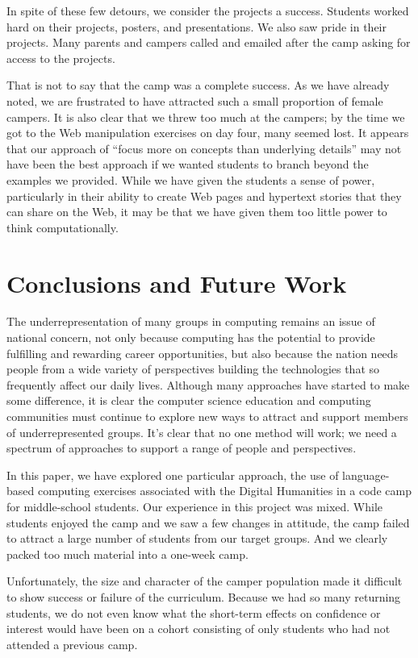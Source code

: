 In spite of these few detours, we consider the projects a success.
Students worked hard on their projects, posters, and presentations.
We also saw pride in their projects.  Many parents and campers
called and emailed after the camp asking for access to the projects.

That is not to say that the camp was a complete success.  As we
have already noted, we are frustrated to have attracted such a small
proportion of female campers.  It is also clear that we threw too
much at the campers; by the time we got to the Web manipulation
exercises on day four, many seemed lost.  It appears that our
approach of ``focus more on concepts than underlying details'' may
not have been the best approach if we wanted students to branch
beyond the examples we provided.  While we have given the students
a sense of power, particularly in their ability to create Web pages
and hypertext stories that they can share on the Web, it may be
that we have given them too little power to think computationally.

\section{Conclusions and Future Work}

The underrepresentation of many groups in computing remains an issue
of national concern, not only because computing has the potential
to provide fulfilling and rewarding career opportunities, but also
because the nation needs people from a wide variety of perspectives
building the technologies that so frequently affect our daily lives.
Although many approaches have started to make some difference, it
is clear the computer science education and computing communities
must continue to explore new ways to attract and support members
of underrepresented groups.  It's clear that no one method will
work; we need a spectrum of approaches to support a range of
people and perspectives.

In this paper, we have explored one particular approach, the use
of language-based computing exercises associated with the Digital
Humanities in a code camp for middle-school students.  Our experience
in this project was mixed.  While students enjoyed the camp
and we saw a few changes in attitude, the camp failed to attract a
large number of students from our target groups.  And we clearly
packed too much material into a one-week camp.

Unfortunately, the size and character of the camper population made
it difficult to show success or failure of the curriculum.  Because
we had so many returning students, we do not even know what the
short-term effects on confidence or interest would have been on a
cohort consisting of only students who had not attended a previous
camp.

